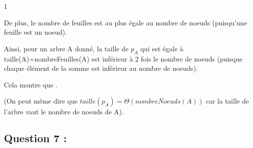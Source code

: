 1\documentclass[a4paper, 11pt,french]{article}
\begin{document}
De plus, le nombre de feuilles est au plus égale au nombre de noeuds (puisqu'une feuille est un noeud).

Ainsi, pour un arbre A donné, la taille de $p_A$ qui est égale à taille(A)+nombreFeuilles(A) est inférieur à 2 fois le nombre de noeuds (puisque chaque élément de la somme est inférieur au nombre de noeuds).

Cela montre que .


(On peut même dire que $taille(p_A)=\Theta(nombreNoeuds(A))$ car la taille de l'arbre vaut le nombre de noeuds de A).

\subsection*{Question 7 : }
\end{document}

